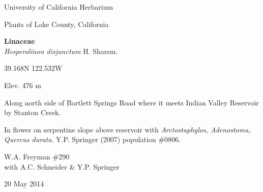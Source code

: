 \documentclass[letterpaper,10pt]{article}
\begin{document}
\begin{minipage}[t]{0.40\textwidth}

\begin{center}
University of California Herbarium \\
\begin{large}
Plants of Lake County, California \\
\end{large}
\vspace{\baselineskip}
\textbf{Linaceae} \\
\textit{Hesperolinon disjunctum} H. Sharsm.\\
\end{center}

\begin{footnotesize}

\begin{multicols}{2}
39.168\textdegree N 122.532\textdegree W
\columnbreak
\begin{flushright}
Elev. 476 m
\end{flushright}
\end{multicols}

Along north side of Bartlett Springs Road where it meets Indian Valley Reservoir by Stanton Creek.
\vspace{\baselineskip}

In flower on serpentine slope above reservoir with \textit{Arctostaphylos, Adenostoma, Quercus durata}. Y.P. Springer (2007) population \#0806.

\begin{multicols}{2}
W.A. Freyman \#290 \\
with A.C. Schneider \& Y.P. Springer
\columnbreak
\begin{flushright}
20 May 2014
\end{flushright}
\end{multicols}

\end{footnotesize}

\end{minipage}
%
\hspace{2cm}
%
\end{document}

